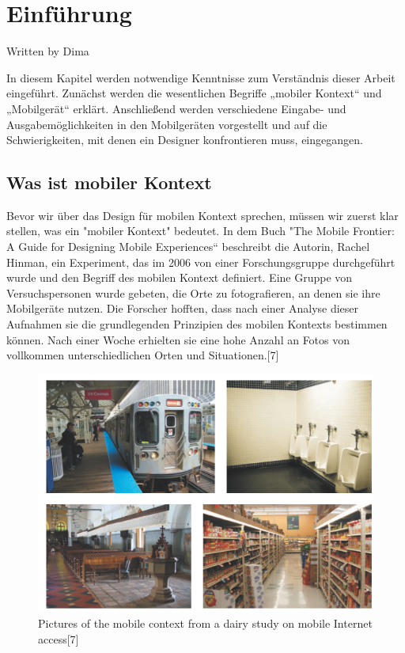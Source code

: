 
\section{Einführung}

Written by Dima

In diesem Kapitel werden notwendige Kenntnisse zum Verständnis dieser Arbeit  eingeführt. Zunächst werden die wesentlichen Begriffe „mobiler Kontext“ und „Mobilgerät“ erklärt. Anschließend  werden verschiedene Eingabe- und Ausgabemöglichkeiten in den Mobilgeräten vorgestellt und auf die Schwierigkeiten, mit denen ein Designer konfrontieren muss, eingegangen.
\subsection{Was ist mobiler Kontext} %
\label{sub:was_ist_mobiler_kontext}
Bevor wir über das Design für mobilen Kontext sprechen, müssen wir zuerst klar stellen, was ein "mobiler Kontext" bedeutet. In dem Buch "The Mobile Frontier: A Guide for Designing Mobile Experiences“ beschreibt die Autorin, Rachel Hinman, ein Experiment, das im 2006 von einer Forschungsgruppe durchgeführt wurde und den Begriff des mobilen Kontext definiert. Eine Gruppe von Versuchspersonen wurde gebeten, die Orte zu fotografieren, an denen sie ihre Mobilgeräte nutzen. Die Forscher hofften, dass nach einer Analyse dieser Aufnahmen sie die grundlegenden Prinzipien des mobilen Kontexts bestimmen können. Nach einer Woche erhielten sie eine hohe Anzahl an Fotos von vollkommen unterschiedlichen Orten und Situationen.[7]

 \begin{figure}[h]
 \centering
 \includegraphics[height=0.25\textheight]{img/studie.png}
 \caption{Pictures of the mobile context from a dairy study on mobile Internet access[7]}
\end{figure}

